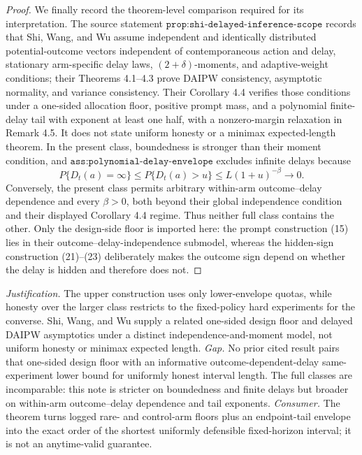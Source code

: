 \documentclass{article}
\begin{document}
\begin{proof}
We finally record the theorem-level comparison required for its interpretation.  The source statement \(\texttt{prop:shi-delayed-inference-scope}\) records that Shi, Wang, and Wu \cite{ShiWangWu2023DelayedInference} assume independent and identically distributed potential-outcome vectors independent of contemporaneous action and delay, stationary arm-specific delay laws, \((2+\delta)\)-moments, and adaptive-weight conditions; their Theorems 4.1--4.3 prove DAIPW consistency, asymptotic normality, and variance consistency.  Their Corollary 4.4 verifies those conditions under a one-sided allocation floor, positive prompt mass, and a polynomial finite-delay tail with exponent at least one half, with a nonzero-margin relaxation in Remark 4.5.  It does not state uniform honesty or a minimax expected-length theorem.  In the present class, boundedness is stronger than their moment condition, and \(\texttt{ass:polynomial-delay-envelope}\) excludes infinite delays because
\[
 P\{D_t(a)=\infty\}
 \leq P\{D_t(a)>u\}
 \leq L(1+u)^{-\beta}\longrightarrow0.
 \tag{27}
\]
Conversely, the present class permits arbitrary within-arm outcome--delay dependence and every \(\beta>0\), both beyond their global independence condition and their displayed Corollary 4.4 regime.  Thus neither full class contains the other.  Only the design-side floor is imported here: the prompt construction (15) lies in their outcome--delay-independence submodel, whereas the hidden-sign construction (21)--(23) deliberately makes the outcome sign depend on whether the delay is hidden and therefore does not.
\end{proof}
\par\smallskip\noindent \textit{Justification.} The upper construction uses only lower-envelope quotas, while honesty over the larger class restricts to the fixed-policy hard experiments for the converse. Shi, Wang, and Wu supply a related one-sided design floor and delayed DAIPW asymptotics under a distinct independence-and-moment model, not uniform honesty or minimax expected length. \textit{Gap.} No prior cited result pairs that one-sided design floor with an informative outcome-dependent-delay same-experiment lower bound for uniformly honest interval length. The full classes are incomparable: this note is stricter on boundedness and finite delays but broader on within-arm outcome--delay dependence and tail exponents. \textit{Consumer.} The theorem turns logged rare- and control-arm floors plus an endpoint-tail envelope into the exact order of the shortest uniformly defensible fixed-horizon interval; it is not an anytime-valid guarantee.
\end{document}
